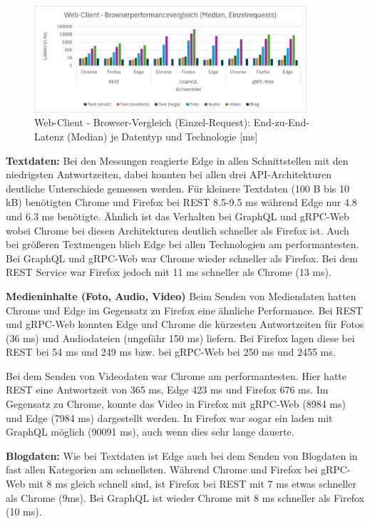 \clearpage

\begin{figure}[htbp]
	\centering
	\includegraphics[width=0.9\textwidth]{images/Browserperformance.png}
	\caption{Web-Client - Browser-Vergleich (Einzel-Request): End-zu-End-Latenz (Median) je Datentyp und Technologie [ms]}
	\label{fig:webclient-browser-comparison}
\end{figure}

\textbf{Textdaten:}  
Bei den Messungen reagierte Edge in allen Schnittstellen mit den niedrigsten Antwortzeiten, dabei konnten bei allen drei API-Architekturen deutliche Unterschiede gemessen werden. Für kleinere Textdaten (100 B bis 10 kB) benötigten Chrome und Firefox bei REST 8.5-9.5 ms während Edge nur 4.8 und 6.3 ms benötigte. Ähnlich ist das Verhalten bei GraphQL und gRPC-Web wobei Chrome bei diesen Architekturen deutlich schneller als Firefox ist. Auch bei größeren Textmengen blieb Edge bei allen Technologien am performantesten. Bei GraphQL und gRPC-Web war Chrome wieder schneller als Firefox. Bei dem REST Service war Firefox jedoch mit 11 ms schneller als Chrome (13 ms).


\textbf{Medieninhalte (Foto, Audio, Video)}  
Beim Senden von Mediendaten hatten Chrome und Edge im Gegensatz zu Firefox eine ähnliche Performance. Bei REST und gRPC-Web konnten Edge und Chrome die kürzesten Antwortzeiten für Fotos (36 ms) und Audiodateien (ungefähr 150 ms)  liefern. Bei Firefox lagen diese bei REST bei 54 ms und 249 ms bzw. bei gRPC-Web bei 250 ms und 2455 ms.

Bei dem Senden von Videodaten war Chrome am performantesten. Hier hatte REST eine Antwortzeit von 365 ms, Edge 423 ms und Firefox 676 ms. Im Gegensatz zu Chrome, konnte das Video in Firefox mit gRPC-Web (8984 ms) und Edge (7984 ms) dargestellt werden. In Firefox war sogar ein laden mit GraphQL möglich (90091 ms), auch wenn dies sehr lange dauerte.


\textbf{Blogdaten:}  
Wie bei Textdaten ist Edge auch bei dem Senden von Blogdaten in fast allen Kategorien am schnellsten. Während Chrome und Firefox bei gRPC-Web mit 8 ms gleich schnell sind, ist Firefox bei REST mit 7 ms etwas schneller als Chrome (9ms). Bei GraphQL ist wieder Chrome mit 8 ms schneller als Firefox (10 ms).


